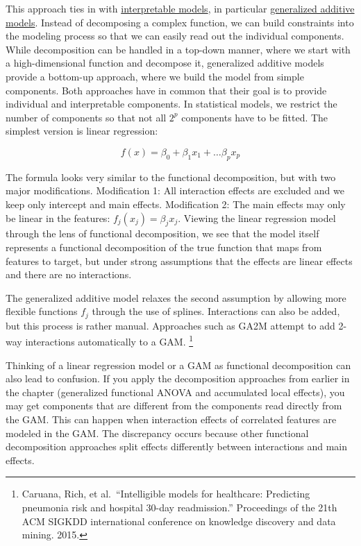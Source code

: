 \documentclass[
  12pt,
]{krantz}
\begin{document}
This approach ties in with \protect\hyperlink{simple}{interpretable models}, in particular \protect\hyperlink{extend-lm}{generalized additive models}.
Instead of decomposing a complex function, we can build constraints into the modeling process so that we can easily read out the individual components.
While decomposition can be handled in a top-down manner, where we start with a high-dimensional function and decompose it, generalized additive models provide a bottom-up approach, where we build the model from simple components.
Both approaches have in common that their goal is to provide individual and interpretable components.
In statistical models, we restrict the number of components so that not all \(2^p\) components have to be fitted.
The simplest version is linear regression:

\[f(x) = \beta_0 + \beta_1 x_1 + \ldots \beta_p x_p\]

The formula looks very similar to the functional decomposition, but with two major modifications.
Modification 1: All interaction effects are excluded and we keep only intercept and main effects.
Modification 2: The main effects may only be linear in the features: \(f_j(x_j)=\beta_j{}x_j\).
Viewing the linear regression model through the lens of functional decomposition, we see that the model itself represents a functional decomposition of the true function that maps from features to target, but under strong assumptions that the effects are linear effects and there are no interactions.

The generalized additive model relaxes the second assumption by allowing more flexible functions \(f_j\) through the use of splines.
Interactions can also be added, but this process is rather manual.
Approaches such as GA2M attempt to add 2-way interactions automatically to a GAM. \footnote{Caruana, Rich, et al.~``Intelligible models for healthcare: Predicting pneumonia risk and hospital 30-day readmission.'' Proceedings of the 21th ACM SIGKDD international conference on knowledge discovery and data mining. 2015.}

Thinking of a linear regression model or a GAM as functional decomposition can also lead to confusion.
If you apply the decomposition approaches from earlier in the chapter (generalized functional ANOVA and accumulated local effects), you may get components that are different from the components read directly from the GAM.
This can happen when interaction effects of correlated features are modeled in the GAM.
The discrepancy occurs because other functional decomposition approaches split effects differently between interactions and main effects.
\end{document}
